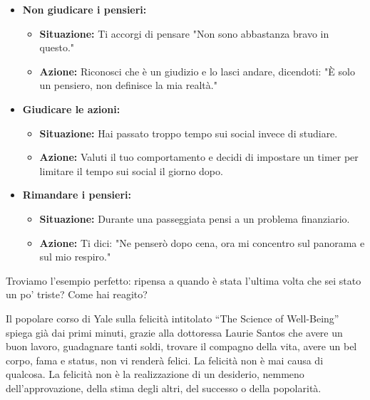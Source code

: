 \documentclass[12pt]{book} %
\begin{document}
\begin{mdframed}[linewidth=1pt]
\begin{itemize}
    \item \textbf{Non giudicare i pensieri:} 
    \begin{itemize}
        \item \textbf{Situazione:} Ti accorgi di pensare "Non sono abbastanza bravo in questo."
        \item \textbf{Azione:} Riconosci che è un giudizio e lo lasci andare, dicendoti: "È solo un pensiero, non definisce la mia realtà."
    \end{itemize}

    \item \textbf{Giudicare le azioni:} 
    \begin{itemize}
        \item \textbf{Situazione:} Hai passato troppo tempo sui social invece di studiare.
        \item \textbf{Azione:} Valuti il tuo comportamento e decidi di impostare un timer per limitare il tempo sui social il giorno dopo.
    \end{itemize}

    \item \textbf{Rimandare i pensieri:} 
    \begin{itemize}
        \item \textbf{Situazione:} Durante una passeggiata pensi a un problema finanziario.
        \item \textbf{Azione:} Ti dici: "Ne penserò dopo cena, ora mi concentro sul panorama e sul mio respiro."
    \end{itemize}
\end{itemize}

Troviamo l'esempio perfetto: ripensa a quando è stata l'ultima volta che sei stato un po' triste? Come hai reagito?
\end{mdframed}

Il popolare corso di Yale sulla felicità intitolato “The Science of
Well-Being” spiega già dai primi minuti, grazie
alla dottoressa Laurie Santos che avere un buon lavoro, guadagnare tanti soldi, trovare il compagno della vita, avere
un bel corpo, fama e status, non vi renderà felici. La felicità non è mai causa di qualcosa. La felicità non è la
realizzazione di un desiderio, nemmeno dell'approvazione, della stima degli altri, del successo o
della popolarità.
\end{document}
